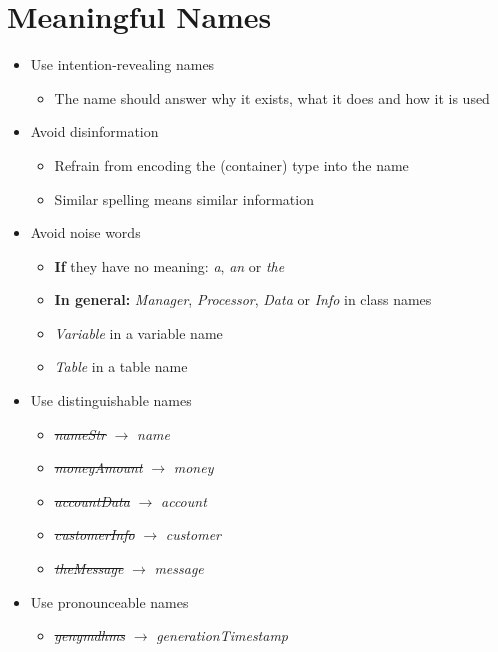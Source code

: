 
\section{Meaningful Names}
\begin{itemize}
    \item Use intention-revealing names
    \begin{itemize}
        \item The name should answer why it exists, what it does and how it is used
    \end{itemize}
    \item Avoid disinformation
    \begin{itemize}
        \item Refrain from encoding the (container) type into the name
        \item Similar spelling means similar information
    \end{itemize}
    \item Avoid noise words
    \begin{itemize}
        \item \textbf{If} they have no meaning: \textit{a}, \textit{an} or \textit{the}
        \item \textbf{In general:} \textit{Manager}, \textit{Processor}, \textit{Data} or \textit{Info} in class names
        \item \textit{Variable} in a variable name
        \item \textit{Table} in a table name
    \end{itemize}
    \item Use distinguishable names
    \begin{itemize}
        \item \st{\textit{nameStr}} $\rightarrow$ \textit{name}
        \item \st{\textit{moneyAmount}} $\rightarrow$ \textit{money}
        \item \st{\textit{accountData}} $\rightarrow$ \textit{account}
        \item \st{\textit{customerInfo}} $\rightarrow$ \textit{customer}
        \item \st{\textit{theMessage}} $\rightarrow$ \textit{message}
    \end{itemize}
    \item Use pronounceable names
    \begin{itemize}
        \item \st{\textit{genymdhms}} $\rightarrow$ \textit{generationTimestamp}

\end{itemize}
\end{itemize}
